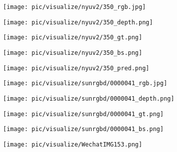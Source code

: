 \documentclass[10pt,twocolumn,letterpaper]{article}
\begin{document}
\begin{figure*}[t]
   \centering


\begin{minipage}[c]{0.091\linewidth}
      \texttt{[image: pic/visualize/nyuv2/350\_rgb.jpg]}
   \end{minipage}
   \begin{minipage}[c]{0.091\linewidth}
      \texttt{[image: pic/visualize/nyuv2/350\_depth.png]}
   \end{minipage}
   \begin{minipage}[c]{0.091\linewidth}
      \texttt{[image: pic/visualize/nyuv2/350\_gt.png]}
   \end{minipage}
   \begin{minipage}[c]{0.091\linewidth}
      \texttt{[image: pic/visualize/nyuv2/350\_bs.png]}
   \end{minipage}
   \begin{minipage}[c]{0.091\linewidth}
      \texttt{[image: pic/visualize/nyuv2/350\_pred.png]}
   \end{minipage}\hspace{3pt}
   \begin{minipage}[c]{0.091\linewidth}
      \texttt{[image: pic/visualize/sunrgbd/0000041\_rgb.jpg]}
   \end{minipage}
   \begin{minipage}[c]{0.091\linewidth}
      \texttt{[image: pic/visualize/sunrgbd/0000041\_depth.png]}
   \end{minipage}
   \begin{minipage}[c]{0.091\linewidth}
      \texttt{[image: pic/visualize/sunrgbd/0000041\_gt.png]}
   \end{minipage}
   \begin{minipage}[c]{0.091\linewidth}
      \texttt{[image: pic/visualize/sunrgbd/0000041\_bs.png]}
   \end{minipage}
   \begin{minipage}[c]{0.091\linewidth}
      \texttt{[image: pic/visualize/WechatIMG153.png]}
   \end{minipage}


\end{figure*}
\end{document}
